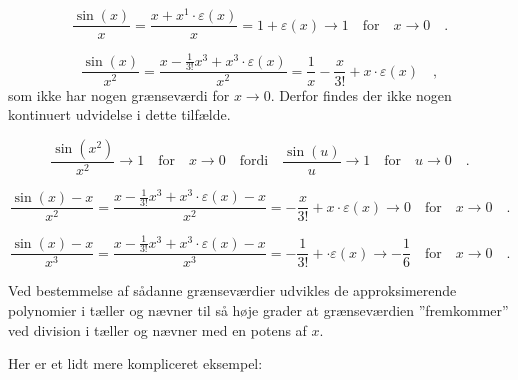 \begin{example} \label{exampFunkFrac}
\begin{equation}
\frac{\sin(x)}{x} = \frac{x + x^{1}\cdot\varepsilon(x)}{x} = 1 + \varepsilon(x) \to 1 \quad \textrm{for} \quad x \to 0 \quad .
\end{equation}

\begin{equation}
\frac{\sin(x)}{x^{2}} = \frac{x - \frac{1}{3!}x^{3} + x^{3}\cdot\varepsilon(x)}{x^{2}} = \frac{1}{x} - \frac{x}{3!} + x\cdot \varepsilon(x) \quad,
\end{equation}
som ikke har nogen grænseværdi for $x \to 0$. Derfor findes der ikke nogen kontinuert udvidelse i dette tilfælde.

\begin{equation}
\frac{\sin(x^2)}{x^{2}} \to 1 \quad \textrm{for} \quad x \to 0 \quad \textrm{fordi} \quad \frac{\sin(u)}{u} \to 1 \quad \textrm{for} \quad u \to 0 \quad.
\end{equation}

\begin{equation}
\frac{\sin(x)-x}{x^{2}} = \frac{x - \frac{1}{3!}x^{3} + x^{3}\cdot\varepsilon(x) - x}{x^{2}} = - \frac{x}{3!} + x\cdot \varepsilon(x) \to 0 \quad \textrm{for} \quad x \to 0 \quad .
\end{equation}

\begin{equation}
\frac{\sin(x)-x}{x^{3}} =   \frac{x - \frac{1}{3!}x^{3} + x^{3}\cdot\varepsilon(x) - x}{x^{3}} = - \frac{1}{3!} + \cdot \varepsilon(x)                                     \to -\frac{1}{6} \quad \textrm{for} \quad x \to 0 \quad .
\end{equation}
\end{example}


\begin{aha}
Ved bestemmelse af sådanne grænseværdier udvikles de approksimerende polynomier i tæller og nævner til så høje grader at grænseværdien ''fremkommer'' ved division i tæller og nævner med en potens af $x$.
\end{aha}

 Her er et lidt mere kompliceret eksempel:



